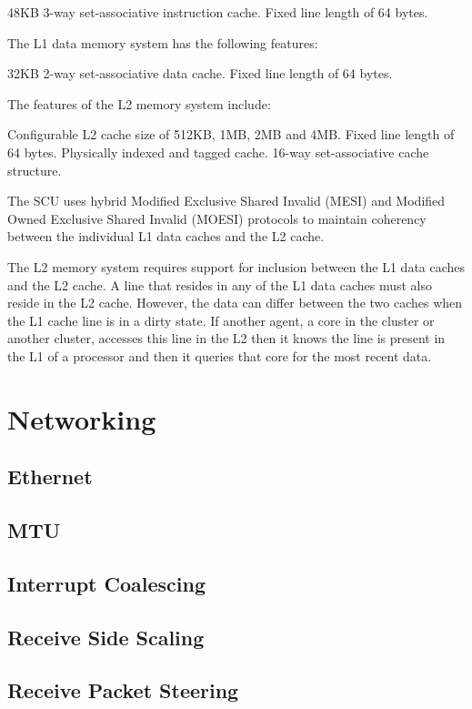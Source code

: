 \documentclass{report}
\begin{document}
48KB 3-way set-associative instruction cache.
Fixed line length of 64 bytes.

The L1 data memory system has the following features:

32KB 2-way set-associative data cache.
Fixed line length of 64 bytes.

The features of the L2 memory system include:

Configurable L2 cache size of 512KB, 1MB, 2MB and 4MB.
Fixed line length of 64 bytes.
Physically indexed and tagged cache.
16-way set-associative cache structure.

The SCU uses hybrid Modified Exclusive Shared Invalid (MESI) and Modified Owned Exclusive Shared Invalid (MOESI) protocols to maintain coherency between the individual L1 data caches and the L2 cache.

The L2 memory system requires support for inclusion between the L1 data caches and the L2 cache. A line that resides in any of the L1 data caches must also reside in the L2 cache. However, the data can differ between the two caches when the L1 cache line is in a dirty state. If another agent, a core in the cluster or another cluster, accesses this line in the L2 then it knows the line is present in the L1 of a processor and then it queries that core for the most recent data.


%
%
\section{Networking}

\subsection{Ethernet}

\subsection{MTU}

\subsection{Interrupt Coalescing}

\subsection{Receive Side Scaling}

\subsection{Receive Packet Steering}
\end{document}
